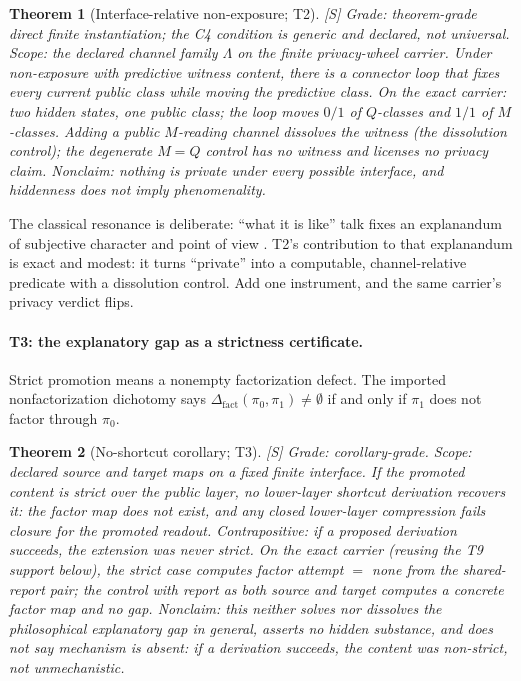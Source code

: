 \documentclass[11pt]{article}
\newcommand{\gradeS}{\textsf{[S]}}
\newcommand{\Dfact}{\Delta_{\mathrm{fact}}}
\newtheorem{theorem}{Theorem}[section]
\theoremstyle{definition}
\begin{document}
\begin{theorem}[Interface-relative non-exposure; T2]
\gradeS{} \emph{Grade:} theorem-grade direct finite instantiation; the C4
condition is generic and declared, not universal. \emph{Scope:} the declared
channel family $\Lambda$ on the finite privacy-wheel carrier. Under
non-exposure with predictive witness content, there is a connector loop that
fixes every current public class while moving the predictive class. On the
exact carrier: two hidden states, one public class; the loop moves $0/1$ of
$Q$-classes and $1/1$ of $M$-classes. Adding a public $M$-reading channel
dissolves the witness (the dissolution control); the degenerate $M=Q$ control
has no witness and licenses no privacy claim. \emph{Nonclaim:} nothing is
private under every possible interface, and hiddenness does not imply
phenomenality.
\end{theorem}

The classical resonance is deliberate: ``what it is like'' talk fixes an
explanandum of subjective character and point of view \citep{Nagel1974}.
T2's contribution to that explanandum is exact and modest: it turns
``private'' into a computable, channel-relative predicate with a dissolution
control. Add one instrument, and the same carrier's privacy verdict
flips.

\paragraph{T3: the explanatory gap as a strictness certificate.}
Strict promotion means a nonempty factorization defect. The imported
nonfactorization dichotomy says $\Dfact(\pi_0, \pi_1)\neq\emptyset$ if and
only if $\pi_1$ does not factor through $\pi_0$.

\begin{theorem}[No-shortcut corollary; T3]
\gradeS{} \emph{Grade:} corollary-grade. \emph{Scope:} declared source and
target maps on a fixed finite interface. If the promoted content is strict
over the public layer, no lower-layer shortcut derivation recovers it: the
factor map does not exist, and any closed lower-layer compression fails
closure for the promoted readout. Contrapositive: if a proposed derivation
succeeds, the extension was never strict. On the exact carrier (reusing the
T9 support below), the strict case computes factor attempt $=$ none from the
shared-report pair; the control with report as both source and target
computes a concrete factor map and no gap. \emph{Nonclaim:} this neither
solves nor dissolves the philosophical explanatory gap in general, asserts no
hidden substance, and does not say mechanism is absent: if a derivation
succeeds, the content was non-strict, not unmechanistic.
\end{theorem}
\end{document}
